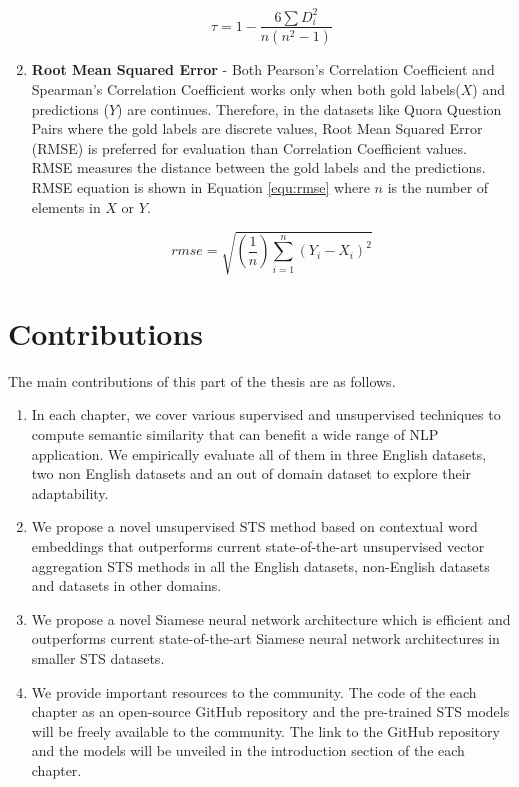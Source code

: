 \begin{enumerate}
	
	\begin{equation}
	\label{equ:spearman}
	\tau = 1- {\frac {6 \sum D_i^2}{n(n^2 - 1)}}
	\end{equation}
	
	
	\item \textbf{Root Mean Squared Error} - Both Pearson's Correlation Coefficient and Spearman's Correlation Coefficient works only when both gold labels($X$) and predictions ($Y$) are continues. Therefore, in the datasets like Quora Question Pairs where the gold labels are discrete values, Root Mean Squared Error (RMSE) is preferred for evaluation than Correlation Coefficient values. RMSE measures the distance between the gold labels and the predictions. RMSE equation is shown in Equation \ref{equ:rmse} where $n$ is the number of elements in $X$ or $Y$. 
	
	\begin{equation}
	\label{equ:rmse}
	rmse = \sqrt{(\frac{1}{n})\sum_{i=1}^{n}(Y_{i} - X_{i})^{2}}
	\end{equation}
	
\end{enumerate}


\section{Contributions}
\label{sec:sts_intro_contribution}
The main contributions of this part of the thesis are as follows.

\begin{enumerate}
	\item In each chapter, we cover various supervised and unsupervised techniques to compute semantic similarity that can benefit a wide range of NLP application. We empirically evaluate all of them in three English datasets, two non English datasets and an out of domain dataset to explore their adaptability. 
	
	\item We propose a novel unsupervised STS method based on contextual word embeddings that outperforms current state-of-the-art unsupervised vector aggregation STS methods in all the English datasets, non-English datasets and datasets in other domains. 
	
	\item We propose a novel Siamese neural network architecture which is efficient and outperforms current state-of-the-art Siamese neural network architectures in smaller STS datasets. 
	
	\item We provide important resources to the community. The code of the each chapter as an open-source GitHub repository and the pre-trained STS models will be freely available to the community. The link to the GitHub repository and the models will be unveiled in the introduction section of the each chapter. 
\end{enumerate}


